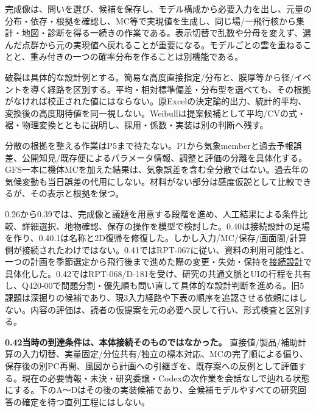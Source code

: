 \documentclass[11pt,a4paper]{article}
\begin{document}
完成像は、問いを選び、候補を保存し、モデル構成から必要入力を出し、元量の分布・依存・根拠を確認し、MC等で実現値を生成し、同じ場/一飛行核から集計・地図・診断を得る一続きの作業である。表示切替で乱数や分母を変えず、選んだ点群から元の実現値へ戻れることが重要になる。モデルごとの雲を重ねることと、重み付きの一つの確率分布を作ることは別機能である。

破裂は具体的な設計例とする。簡易な高度直接指定/分布と、膜厚等から径/イベントを導く経路を区別する。平均・相対標準偏差・分布型を選べても、その根拠がなければ校正された値にはならない。原Excelの決定論的出力、統計的平均、変換後の高度期待値を同一視しない。Weibullは提案候補として平均/CVの式・裾・物理変換とともに説明し、採用・係数・実装は別の判断へ残す。

分散の根拠を整える作業はP5まで待たない。P1から気象memberと過去予報誤差、公開知見/既存便によるパラメータ情報、調整と評価の分離を具体化する。GFS一本に機体MCを加えた結果は、気象誤差を含む全分散ではない。過去年の気候変動も当日誤差の代用にしない。材料がない部分は感度仮説として比較できるが、その表示と根拠を保つ。

0.26から0.39では、完成像と議題を用意する段階を進め、人工結果による条件比較、詳細選択、地物確認、保存の操作を模型で検討した。0.40は接続設計の足場を作り、0.40.1は名称と2D復帰を修復した。しかし入力/MC/保存/画面間/計算側が接続されたわけではない。0.41ではRPT-067に従い、資料の利用可能性と、一つの計画を季節選定から飛行後まで進めた際の変更・失効・保持を\href{INTEGRATION_DESIGN.html}{接続設計}で具体化した。0.42ではRPT-068/D-181を受け、研究の共通文脈とUIの行程を共有し、Q420-00で問題分割・優先順も問い直して具体的な設計判断を進める。旧5課題は深掘りの候補であり、現3入力経路や下表の順序を追認させる依頼にはしない。内容の評価は、読者の仮提案を元の必要へ戻して行い、形式検査と区別する。

\textbf{0.42当時の到達条件は、本体接続そのものではなかった。}
直接値/製品/補助計算の入力切替、実量固定/分位共有/独立の標本対応、MCの完了順による偏り、保存後の別PC再開、風図から計画への引継ぎを、既存案への反例として評価する。現在の必要情報・未決・研究委譲・Codexの次作業を会話なしで辿れる状態にする。下のA〜Dはその後の実装候補であり、全候補モデルやすべての研究回答の確定を待つ直列工程にはしない。
\end{document}
